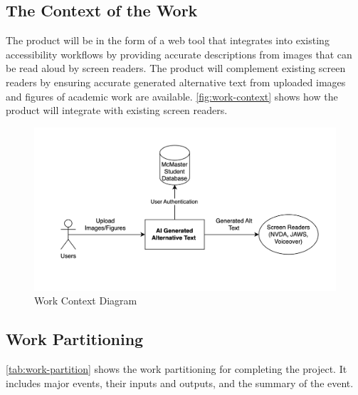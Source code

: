\documentclass[12pt]{article}
\begin{document}
\subsection{The Context of the Work}
The product will be in the form of a web tool that integrates into
existing accessibility workflows
by providing accurate descriptions from images that can be read aloud
by screen readers. The product
will complement existing screen readers by ensuring accurate
generated alternative text from
uploaded images and figures of academic work are available.
\autoref{fig:work-context} shows
how the product will integrate with existing screen readers.

\begin{figure}[H] %
  \centering
  \includegraphics[width=\textwidth]{images/work-context-diagram.png}
  \caption{Work Context Diagram}
  \label{fig:work-context}
\end{figure}
\FloatBarrier   %

\subsection{Work Partitioning}
\autoref{tab:work-partition} shows the work partitioning for
completing the project. It includes major events,
their inputs and outputs, and the summary of the event.
\end{document}
